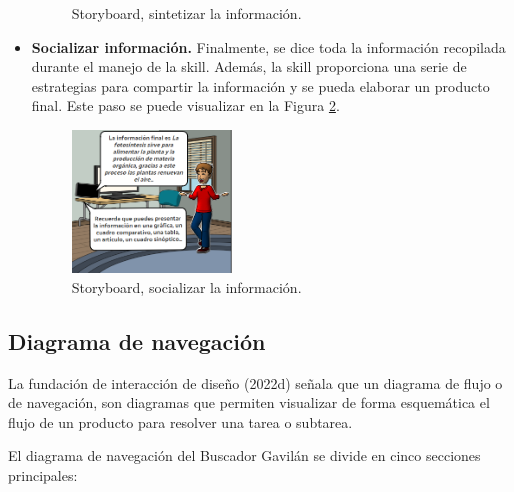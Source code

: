 \begin{itemize}
\begin{figure}[H]
    \caption{Storyboard, sintetizar la información.}
    \label{fig:420}
  \end{figure}
  \item \textbf{Socializar información.} Finalmente, se dice toda la información recopilada durante el manejo de la skill. Además, la skill proporciona una serie de estrategias para compartir la información y se pueda elaborar un producto final. Este paso se puede visualizar en la Figura \ref{fig:421}.
  \begin{figure}[H]
    \centering
    \includegraphics[width=0.40\textwidth]{Cap4/Figuras/06.png}
    \caption{Storyboard, socializar la información.}
    \label{fig:421}
  \end{figure}
\end{itemize}


\subsection{Diagrama de navegación}
\label{DiagramaNavegacioncapIV}

La fundación de interacción de diseño (2022d) señala que un diagrama de flujo o de navegación, son diagramas que permiten visualizar de forma esquemática el flujo de un producto para resolver una tarea o subtarea.

El diagrama de navegación del Buscador Gavilán se divide en cinco secciones principales:

